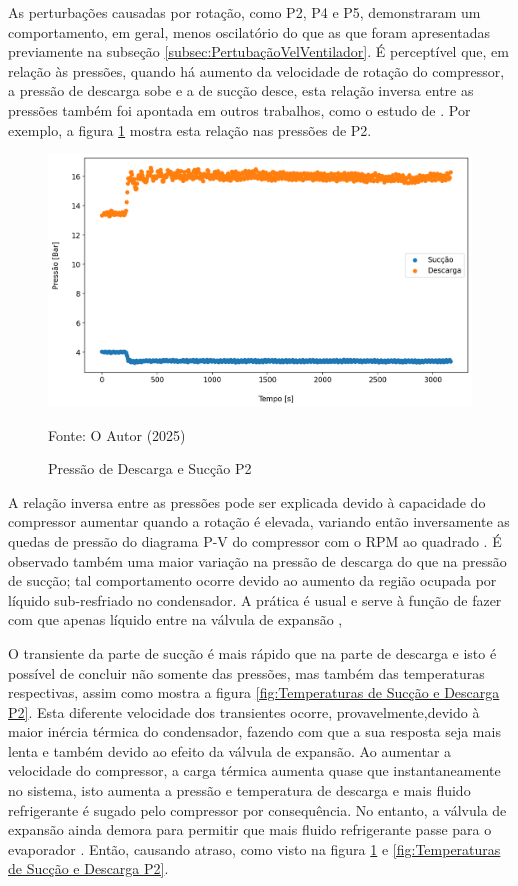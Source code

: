 As perturbações causadas por rotação, como P2, P4 e P5, demonstraram um comportamento, em geral, menos oscilatório do que as que foram apresentadas previamente na subseção \ref{subsec:PertubaçãoVelVentilador}. É perceptível que, em relação às pressões, quando há aumento da velocidade de rotação do compressor, a pressão de descarga sobe e a de sucção desce, esta relação inversa entre as pressões também foi apontada em outros trabalhos, como o estudo de \textcite{EffectsOFRefrigeranteCompressorAirFlow}. Por exemplo, a figura \ref{fig:Pressão de Descarga e Sucção P2} mostra esta relação nas pressões de P2. 
\newpage
\begin{figure}
    \centering
    \includegraphics[width=1\linewidth]{FigurasdoTexto/Pressão de Descarga e Sucção P2.png}
    \caption{Pressão de Descarga e Sucção P2}
    \label{fig:Pressão de Descarga e Sucção P2}
    {\footnotesize Fonte: O Autor (2025)}
\end{figure}

A relação inversa entre as pressões pode ser explicada devido à capacidade do compressor aumentar quando a rotação é elevada, variando então inversamente as quedas de pressão do diagrama P-V do compressor com o RPM ao quadrado \cite{phillippi2008basic}.
É observado também uma maior variação na pressão de descarga do que na pressão de sucção; tal comportamento ocorre devido ao aumento da região ocupada por líquido sub-resfriado no condensador. A prática é usual e serve à função de fazer com que apenas líquido entre na válvula de expansão \cite{StoekerRefrigeration},

O transiente da parte de sucção é mais rápido que na parte de descarga e isto é possível de concluir não somente das pressões, mas também das temperaturas respectivas, assim como mostra a figura \ref{fig:Temperaturas de Sucção e Descarga P2}. Esta diferente velocidade dos transientes ocorre, provavelmente,devido à maior inércia térmica do condensador, fazendo com que a sua resposta seja mais lenta e também devido ao efeito da válvula de expansão. Ao aumentar a velocidade do compressor, a carga térmica aumenta quase que instantaneamente no sistema, isto aumenta a pressão e temperatura de descarga e mais  fluido refrigerante é sugado pelo compressor por consequência. No entanto, a válvula de expansão ainda demora para permitir que mais fluido refrigerante passe para o evaporador \cite{CHEN20081368}. Então, causando atraso, como visto na figura \ref{fig:Pressão de Descarga e Sucção P2} e \ref{fig:Temperaturas de Sucção e Descarga P2}. 

